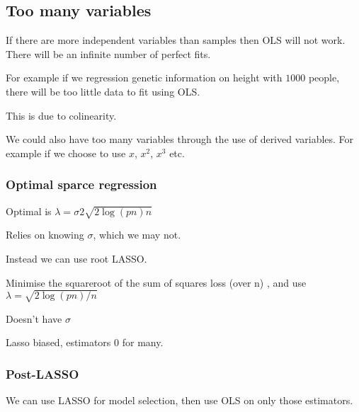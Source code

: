 
\subsection{Too many variables}

If there are more independent variables than samples then OLS will not work. There will be an infinite number of perfect fits.

For example if we regression genetic information on height with \(1000\) people, there will be too little data to fit using OLS.

This is due to colinearity.

We could also have too many variables through the use of derived variables. For example if we choose to use \(x\), \(x^2\), \(x^3\) etc.

\subsubsection{Optimal sparce regression}

Optimal is \(\lambda = \sigma 2\sqrt {{2\log (pn)}{n}}\)

Relies on knowing \(\sigma \), which we may not.

Instead we can use root LASSO.

Minimise the squareroot of the sum of squares loss (over n) , and use \(\lambda = \sqrt{2\log (pn)/n}\)

Doesn't have \(\sigma \)

Lasso biased, estimators \(0\) for many.

\subsubsection{Post-LASSO}

We can use LASSO for model selection, then use OLS on only those estimators.

